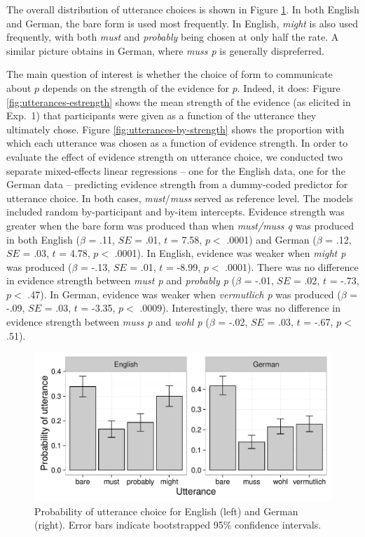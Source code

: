 \documentclass[11pt]{article}
\newcommand{\figref}[1]{Figure \ref{#1}}
\begin{document}
The overall distribution of utterance choices is shown in \figref{fig:utterances}. In both English and German, the bare form is used most frequently. In English, \emph{might} is also used frequently, with both \emph{must} and \emph{probably} being chosen at only half the rate. A similar picture obtains in German, where \emph{muss p} is generally dispreferred.

The main question of interest  is whether the choice of form to communicate about $p$ depends on the strength of the evidence for $p$. Indeed, it does: \figref{fig:utterances-estrength} shows the mean strength of the evidence (as elicited in Exp.~1) that participants were given as a function of the utterance they ultimately chose. \figref{fig:utterances-by-strength} shows the proportion with which each utterance was chosen as a function of evidence strength.   In order to evaluate the effect of evidence strength on utterance choice, we conducted two separate mixed-effects linear regressions -- one for the English data, one for the German data -- predicting evidence strength from a dummy-coded predictor for utterance choice. In both cases, \emph{must}/\emph{muss} served as reference level. The models included random by-participant and by-item  intercepts. Evidence strength was greater when the bare form was produced than when \emph{must/muss q} was produced in both English ($\beta$ = .11, $SE$ = .01, $t$ = 7.58, $p <$ .0001) and German ($\beta$ = .12, $SE$ = .03, $t$ = 4.78, $p <$ .0001). In English, evidence   was weaker  when \emph{might p} was produced  ($\beta$ = -.13, $SE$ = .01, $t$ = -8.99, $p <$ .0001). There was no difference in evidence strength between \emph{must p} and \emph{probably p}  ($\beta$ = -.01, $SE$ = .02, $t$ = -.73, $p <$ .47). In German, evidence was weaker when \emph{vermutlich p} was produced  ($\beta$ = -.09, $SE$ = .03, $t$ = -3.35, $p <$ .0009). Interestingly, there was no difference in evidence strength between \emph{muss p} and \emph{wohl p}  ($\beta$ = -.02, $SE$ = .03, $t$ = -.67, $p <$ .51).

\begin{figure}
\centering
\includegraphics[width=.9\textwidth]{pics/production-distribution}
\caption{Probability of utterance choice for English (left) and German (right). Error bars indicate bootstrapped 95\% confidence intervals.}
\label{fig:utterances}
\end{figure}
\end{document}
